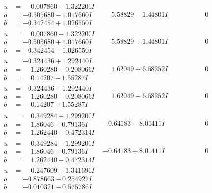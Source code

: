 \documentclass[1p]{elsarticle_modified}
\theoremstyle{definition}
\begin{document}
$$\begin{array}{c|c|c}
\begin{aligned}
u &= \phantom{-}0.007860 + 1.322200 I \\
a &= -0.505680 - 1.017660 I \\
b &= -0.342454 + 1.026550 I\end{aligned}
 & \phantom{-}5.58829 - 1.44801 I & \phantom{-0.000000 } 0 \\ \hline\begin{aligned}
u &= \phantom{-}0.007860 - 1.322200 I \\
a &= -0.505680 + 1.017660 I \\
b &= -0.342454 - 1.026550 I\end{aligned}
 & \phantom{-}5.58829 + 1.44801 I & \phantom{-0.000000 } 0 \\ \hline\begin{aligned}
u &= -0.324436 + 1.292440 I \\
a &= \phantom{-}1.260280 + 0.208066 I \\
b &= \phantom{-}0.14207 - 1.55287 I\end{aligned}
 & \phantom{-}1.62049 + 6.58252 I & \phantom{-0.000000 } 0 \\ \hline\begin{aligned}
u &= -0.324436 - 1.292440 I \\
a &= \phantom{-}1.260280 - 0.208066 I \\
b &= \phantom{-}0.14207 + 1.55287 I\end{aligned}
 & \phantom{-}1.62049 - 6.58252 I & \phantom{-0.000000 } 0 \\ \hline\begin{aligned}
u &= \phantom{-}0.349284 + 1.299200 I \\
a &= \phantom{-}1.86046 - 0.79136 I \\
b &= \phantom{-}1.262440 + 0.472314 I\end{aligned}
 & -0.64183 - 8.01411 I & \phantom{-0.000000 } 0 \\ \hline\begin{aligned}
u &= \phantom{-}0.349284 - 1.299200 I \\
a &= \phantom{-}1.86046 + 0.79136 I \\
b &= \phantom{-}1.262440 - 0.472314 I\end{aligned}
 & -0.64183 + 8.01411 I & \phantom{-0.000000 } 0 \\ \hline\begin{aligned}
u &= \phantom{-}0.247609 + 1.341690 I \\
a &= -0.878663 - 0.254927 I \\
b &= -0.010321 - 0.575786 I\end{aligned}

\end{array}$$
\end{document}
